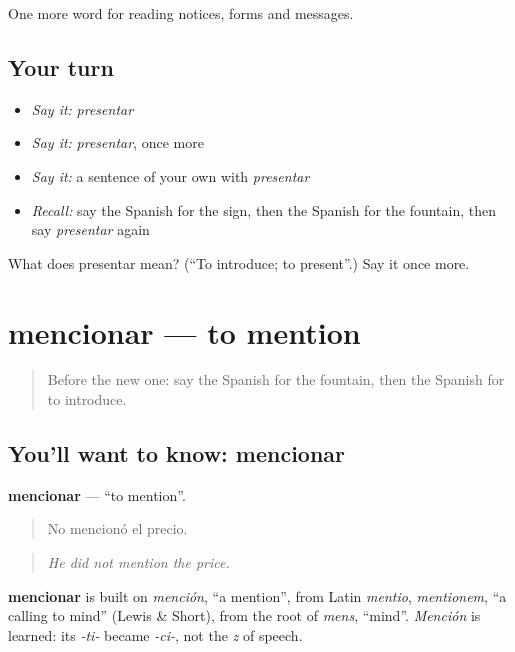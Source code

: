 \begin{grammarlens}[title={What you've built}]
One more word for reading notices, forms and messages.
\end{grammarlens}

\subsection*{Your turn}
\begin{itemize}
\raggedright
  \item \emph{Say it:} \emph{presentar}
  \item \emph{Say it:} \emph{presentar}, once more
  \item \emph{Say it:} a sentence of your own with \emph{presentar}
  \item \emph{Recall:} say the Spanish for the sign, then the Spanish for the fountain, then say \emph{presentar} again
\end{itemize}

\begin{tcolorbox}[breakable,colback=teal!4,colframe=teal!35!black,title={Before you move on}]
What does presentar mean? (\textquotedblleft{}To introduce; to present\textquotedblright{}.) Say it once more.
\end{tcolorbox}
\section[mencionar]{mencionar — to mention}

\label{lesson:ES-C502-mencionar}



\begin{quote}
Before the new one: say the Spanish for the fountain, then the Spanish for to introduce.
\end{quote}

\subsection*{You'll want to know: mencionar}
\textbf{mencionar} — \textquotedblleft{}to mention\textquotedblright{}.

\begin{quote}
No mencionó el precio.
\end{quote}

\begin{quote}
\emph{He did not mention the price.}
\end{quote}

\begin{cousinweb}
\textbf{mencionar} is built on \emph{mención}, \textquotedblleft{}a mention\textquotedblright{}, from Latin \emph{mentio}, \emph{mentionem}, \textquotedblleft{}a calling to mind\textquotedblright{} (Lewis \& Short), from the root of \emph{mens}, \textquotedblleft{}mind\textquotedblright{}. \emph{Mención} is learned: its \emph{-ti-} became \emph{-ci-}, not the \emph{z} of speech.
\end{cousinweb}

